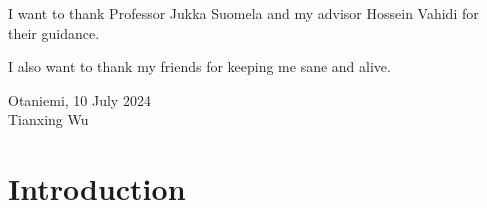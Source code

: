 \documentclass[english, 12pt, a4paper, sci, utf8, a-2b, online]{aaltothesis}
\date{10 July 2024}
\begin{document}
\makecoverpage
\makecopyrightpage

\clearpage


\begin{abstractpage}[english]
	\abstracttext{}
\end{abstractpage}

\dothesispagenumbering{}


I want to thank Professor Jukka Suomela and my advisor Hossein Vahidi for their guidance.

I also want to thank my friends for keeping me sane and alive.

\vspace{5cm}
Otaniemi, 10 July 2024\\

\vspace{5mm}
{\hfill Tianxing Wu \hspace{1cm}}

\newpage

\thesistableofcontents

\cleardoublepage

\section{Introduction}
\label{sec:intro}

\thispagestyle{empty}
\end{document}
